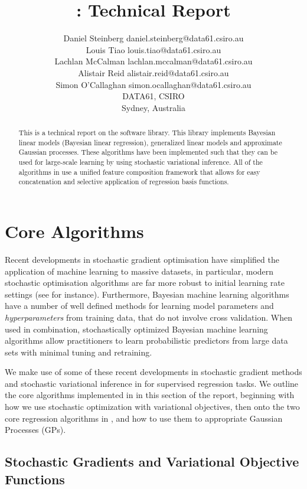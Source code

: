 \documentclass[11pt, oneside]{article}
\title{\revrand{}: Technical Report}
\author{\name Daniel Steinberg \email daniel.steinberg@data61.csiro.au \\
        \name Louis Tiao \email louis.tiao@data61.csiro.au \\
        \name Lachlan McCalman \email lachlan.mccalman@data61.csiro.au \\
        \name Alistair Reid \email alistair.reid@data61.csiro.au \\
        \name Simon O'Callaghan \email simon.ocallaghan@data61.csiro.au \\
        \addr DATA61, CSIRO \\
        Sydney, Australia}
\date{}
\begin{document}
\maketitle

\begin{abstract}
    This is a technical report on the \revrand{} software library. This
    library implements Bayesian linear models (Bayesian linear regression),
    generalized linear models and approximate Gaussian processes. These
    algorithms have been implemented such that they can be used for large-scale
    learning by using stochastic variational inference. All of the algorithms
    in \revrand{} use a unified feature composition framework that allows
    for easy concatenation and selective application of regression basis
    functions.
\end{abstract}

\tableofcontents

\section{Core Algorithms}

Recent developments in stochastic gradient optimisation have simplified the
application of machine learning to massive datasets, in particular, modern
stochastic optimisation algorithms are far more robust to initial learning rate
settings (see \citet{kingma2014adam} for instance). Furthermore, Bayesian
machine learning algorithms have a number of well defined methods for learning
model parameters and \emph{hyperparameters} from training data, that do not
involve cross validation. When used in combination, stochastically optimized
Bayesian machine learning algorithms allow practitioners to learn probabilistic
predictors from large data sets with minimal tuning and retraining.

We make use of some of these recent developments in stochastic gradient methods
and stochastic variational inference in \revrand{} for supervised regression
tasks. We outline the core algorithms implemented in \revrand{} in this section
of the report, beginning with how we use stochastic optimization with
variational objectives, then onto the two core regression algorithms in
\revrand{}, and how to use them to appropriate Gaussian Processes (GPs).

\subsection{Stochastic Gradients and Variational Objective Functions}
\label{sub:stochvar}
\end{document}
